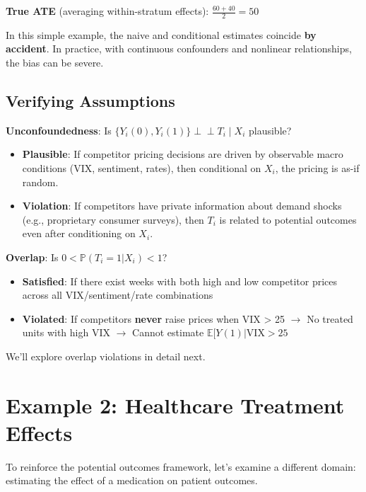 \textbf{True ATE} (averaging within-stratum effects):
\(\frac{60 + 40}{2} = 50\)

In this simple example, the naive and conditional estimates coincide
\textbf{by accident}. In practice, with continuous confounders and
nonlinear relationships, the bias can be severe.

\subsection{Verifying Assumptions}\label{_verifying_assumptions}

\textbf{Unconfoundedness}: Is
\(\{Y_i(0), Y_i(1)\} \perp\!\!\!\perp T_i \mid X_i\) plausible?

\begin{itemize}
\item
  \textbf{Plausible}: If competitor pricing decisions are driven by
  observable macro conditions (VIX, sentiment, rates), then conditional
  on \(X_i\), the pricing is as-if random.
\item
  \textbf{Violation}: If competitors have private information about
  demand shocks (e.g., proprietary consumer surveys), then \(T_i\) is
  related to potential outcomes even after conditioning on \(X_i\).
\end{itemize}

\textbf{Overlap}: Is \(0 < \mathbb{P}(T_i = 1 | X_i) < 1\)?

\begin{itemize}
\item
  \textbf{Satisfied}: If there exist weeks with both high and low
  competitor prices across all VIX/sentiment/rate combinations
\item
  \textbf{Violated}: If competitors \textbf{never} raise prices when VIX
  \textgreater{} 25 $\to$ No treated units with high VIX $\to$ Cannot estimate
  \(\mathbb{E}[Y(1) | \text{VIX} > 25\)
\end{itemize}

We'll explore overlap violations in detail next.

\section{Example 2: Healthcare Treatment
Effects}\label{_example_2_healthcare_treatment_effects}

To reinforce the potential outcomes framework, let's examine a different
domain: estimating the effect of a medication on patient outcomes.

